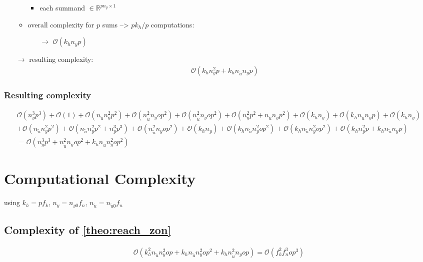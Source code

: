\documentclass{article}
\begin{document}
\begin{itemize}
\begin{itemize}
        \begin{itemize}
            \item each summand $\in \mathbb{R}^{pn_y \times 1}$
        \end{itemize}
        \item overall complexity for $p$ sums --> $p k_h/p$ computations:
        \begin{itemize}
            \item[$\rightarrow$] $\mathcal{O}(k_h n_y p)$
        \end{itemize}
    \end{itemize}    
    \item[$\rightarrow$] resulting complexity: \begin{align*}
        \mathcal{O}(k_h n_y^2 p + k_h n_{\tilde{u}} n_y p)
    \end{align*}
\end{itemize}

\subsubsection{Resulting complexity}
\begin{align*}
\mathcal{O}(n_y^3 p^3) %
+\mathcal{O}(1) %
+\mathcal{O}(n_{\tilde{u}} n_y^2 p^2) %
+\mathcal{O}(n_{\tilde{u}}^2 n_y o p^2) %
+\mathcal{O}(n_{\tilde{u}}^2 n_y o p^2) %
+\mathcal{O}(n_y^2 p^2 + n_{\tilde{u}} n_y p^2) %
+\mathcal{O}(k_h n_y) %
+\mathcal{O}(k_h n_{\tilde{u}} n_y p) %
+\mathcal{O}(k_h n_y)\\ %
+\mathcal{O}(n_{\tilde{u}} n_y^2 p^2) %
+\mathcal{O}(n_{\tilde{u}} n_y^2 p^2 + n_y^3 p^3) %
+\mathcal{O}(n_{\tilde{u}}^2 n_y o p^2) %
+\mathcal{O}(k_h n_y) %
+\mathcal{O}(k_h n_{\tilde{u}} n_y^2 o p^2) %
+\mathcal{O}(k_h n_{\tilde{u}} n_y^2 o p^2) %
+\mathcal{O}(k_h n_y^2 p + k_h n_{\tilde{u}} n_y p) %
 \\ 
= \mathcal{O}(n_y^3 p^3 
+ n_{\tilde{u}}^2 n_y o p^2
+ k_h n_{\tilde{u}} n_y^2 o p^2)
\end{align*}


\newpage
\section{Computational Complexity}
 using $k_h = pf_k$, $n_y = n_{y0} f_n$, $n_{\tilde{u}} = n_{{\tilde{u}}0} f_n$


\subsection{Complexity of \cref{theo:reach_zon}}
\begin{align*}
        \mathcal{O}(k_h^2 n_{\tilde{u}} n_y^2 o p 
    + k_h n_{\tilde{u}} n_y^2 o p^2
    + k_h n_{\tilde{u}}^2 n_y o p) =
    \mathcal{O}(f_k^2 f_n^3 o p^3)
    \end{align*}
\end{document}
